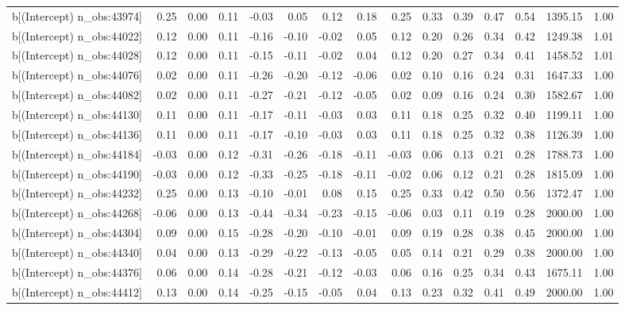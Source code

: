 \begin{table}[ht]
\begin{tabular}{rrrrrrrrrrrrrrr}
  b[(Intercept) n\_obs:43974] & 0.25 & 0.00 & 0.11 & -0.03 & 0.05 & 0.12 & 0.18 & 0.25 & 0.33 & 0.39 & 0.47 & 0.54 & 1395.15 & 1.00 \\ 
  b[(Intercept) n\_obs:44022] & 0.12 & 0.00 & 0.11 & -0.16 & -0.10 & -0.02 & 0.05 & 0.12 & 0.20 & 0.26 & 0.34 & 0.42 & 1249.38 & 1.01 \\ 
  b[(Intercept) n\_obs:44028] & 0.12 & 0.00 & 0.11 & -0.15 & -0.11 & -0.02 & 0.04 & 0.12 & 0.20 & 0.27 & 0.34 & 0.41 & 1458.52 & 1.01 \\ 
  b[(Intercept) n\_obs:44076] & 0.02 & 0.00 & 0.11 & -0.26 & -0.20 & -0.12 & -0.06 & 0.02 & 0.10 & 0.16 & 0.24 & 0.31 & 1647.33 & 1.00 \\ 
  b[(Intercept) n\_obs:44082] & 0.02 & 0.00 & 0.11 & -0.27 & -0.21 & -0.12 & -0.05 & 0.02 & 0.09 & 0.16 & 0.24 & 0.30 & 1582.67 & 1.00 \\ 
  b[(Intercept) n\_obs:44130] & 0.11 & 0.00 & 0.11 & -0.17 & -0.11 & -0.03 & 0.03 & 0.11 & 0.18 & 0.25 & 0.32 & 0.40 & 1199.11 & 1.00 \\ 
  b[(Intercept) n\_obs:44136] & 0.11 & 0.00 & 0.11 & -0.17 & -0.10 & -0.03 & 0.03 & 0.11 & 0.18 & 0.25 & 0.32 & 0.38 & 1126.39 & 1.00 \\ 
  b[(Intercept) n\_obs:44184] & -0.03 & 0.00 & 0.12 & -0.31 & -0.26 & -0.18 & -0.11 & -0.03 & 0.06 & 0.13 & 0.21 & 0.28 & 1788.73 & 1.00 \\ 
  b[(Intercept) n\_obs:44190] & -0.03 & 0.00 & 0.12 & -0.33 & -0.25 & -0.18 & -0.11 & -0.02 & 0.06 & 0.12 & 0.21 & 0.28 & 1815.09 & 1.00 \\ 
  b[(Intercept) n\_obs:44232] & 0.25 & 0.00 & 0.13 & -0.10 & -0.01 & 0.08 & 0.15 & 0.25 & 0.33 & 0.42 & 0.50 & 0.56 & 1372.47 & 1.00 \\ 
  b[(Intercept) n\_obs:44268] & -0.06 & 0.00 & 0.13 & -0.44 & -0.34 & -0.23 & -0.15 & -0.06 & 0.03 & 0.11 & 0.19 & 0.28 & 2000.00 & 1.00 \\ 
  b[(Intercept) n\_obs:44304] & 0.09 & 0.00 & 0.15 & -0.28 & -0.20 & -0.10 & -0.01 & 0.09 & 0.19 & 0.28 & 0.38 & 0.45 & 2000.00 & 1.00 \\ 
  b[(Intercept) n\_obs:44340] & 0.04 & 0.00 & 0.13 & -0.29 & -0.22 & -0.13 & -0.05 & 0.05 & 0.14 & 0.21 & 0.29 & 0.38 & 2000.00 & 1.00 \\ 
  b[(Intercept) n\_obs:44376] & 0.06 & 0.00 & 0.14 & -0.28 & -0.21 & -0.12 & -0.03 & 0.06 & 0.16 & 0.25 & 0.34 & 0.43 & 1675.11 & 1.00 \\ 
  b[(Intercept) n\_obs:44412] & 0.13 & 0.00 & 0.14 & -0.25 & -0.15 & -0.05 & 0.04 & 0.13 & 0.23 & 0.32 & 0.41 & 0.49 & 2000.00 & 1.00 \\ 

\end{tabular}
\end{table}
